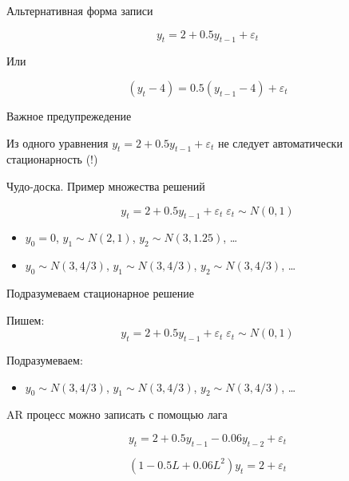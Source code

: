 \documentclass[ignorenonframetext,]{beamer}
\begin{document}
\begin{frame}{Альтернативная форма записи}

\[
y_t = 2 + 0.5 y_{t-1} + \varepsilon_t
\]

Или

\[
(y_t - 4) = 0.5 (y_{t-1} - 4) + \varepsilon_t
\]

\end{frame}

\begin{frame}{Важное предупрежедение}

Из одного уравнения $y_t = 2 + 0.5 y_{t-1} + \varepsilon_t $ не следует
автоматически стационарность (!)

\end{frame}

\begin{frame}{Чудо-доска. Пример множества решений}

\[
y_t = 2 + 0.5 y_{t-1} + \varepsilon_t \; \varepsilon_t \sim N(0,1)
\]

\begin{itemize}
\item
  $y_0=0$, $y_1\sim N(2,1)$, $y_2\sim N(3, 1.25)$, \ldots
\item
  $y_0\sim N(3, 4/3)$, $y_1\sim N(3, 4/3)$, $y_2\sim N(3, 4/3)$, \ldots
\end{itemize}

\end{frame}

\begin{frame}{Подразумеваем стационарное решение}

Пишем: \[
y_t = 2 + 0.5 y_{t-1} + \varepsilon_t \; \varepsilon_t \sim N(0,1)
\]

Подразумеваем:

\begin{itemize}
\itemsep1pt\parskip0pt
\item
  $y_0\sim N(3, 4/3)$, $y_1\sim N(3, 4/3)$, $y_2\sim N(3, 4/3)$, \ldots
\end{itemize}

\end{frame}

\begin{frame}{AR процесс можно записать с помощью лага}

\[
y_t=2+0.5y_{t-1}-0.06y_{t-2}+\varepsilon_t
\]

\[
(1-0.5L+0.06L^2)y_t=2+\varepsilon_t
\]

\end{frame}
\end{document}
